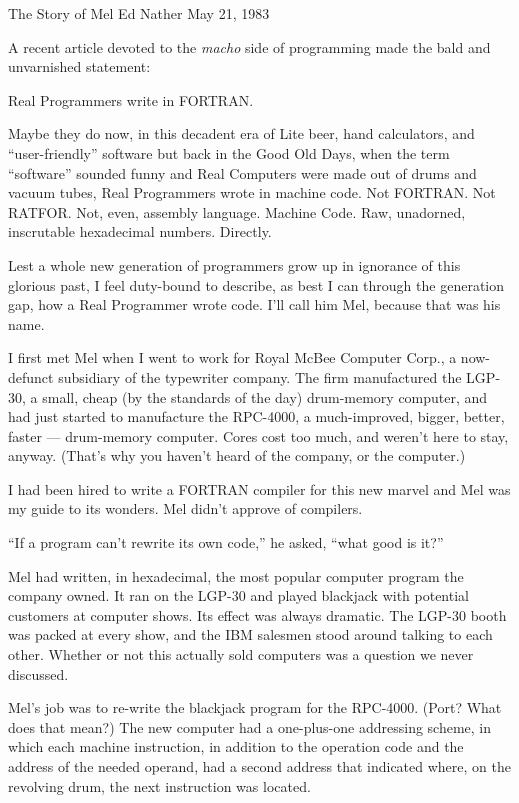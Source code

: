 \documentclass[12pt]{article}
\begin{document}
\noindent
The Story of Mel\newline
Ed Nather\newline
May 21, 1983

\bigskip
\noindent
A recent article devoted to the {\it macho} side of programming
made the bald and unvarnished statement:

\bigskip
\noindent
Real Programmers write in FORTRAN.

\bigskip
\noindent
Maybe they do now,
in this decadent era of
Lite beer, hand calculators, and ``user-friendly'' software
but back in the Good Old Days,
when the term ``software'' sounded funny
and Real Computers were made out of drums and vacuum tubes,
Real Programmers wrote in machine code.
Not FORTRAN.  Not RATFOR.  Not, even, assembly language.
Machine Code.
Raw, unadorned, inscrutable hexadecimal numbers.
Directly.

\bigskip
\noindent
Lest a whole new generation of programmers
grow up in ignorance of this glorious past,
I feel duty-bound to describe,
as best I can through the generation gap,
how a Real Programmer wrote code.
I'll call him Mel,
because that was his name.

\bigskip
\noindent
I first met Mel when I went to work for Royal McBee Computer Corp.,
a now-defunct subsidiary of the typewriter company.
The firm manufactured the LGP-30,
a small, cheap (by the standards of the day)
drum-memory computer,
and had just started to manufacture
the RPC-4000, a much-improved,
bigger, better, faster --- drum-memory computer.
Cores cost too much,
and weren't here to stay, anyway.
(That's why you haven't heard of the company,
or the computer.)

\bigskip
\noindent
I had been hired to write a FORTRAN compiler
for this new marvel and Mel was my guide to its wonders.
Mel didn't approve of compilers.

\bigskip
\noindent
``If a program can't rewrite its own code,''
he asked, ``what good is it?''

\bigskip
\noindent
Mel had written,
in hexadecimal,
the most popular computer program the company owned.
It ran on the LGP-30
and played blackjack with potential customers
at computer shows.
Its effect was always dramatic.
The LGP-30 booth was packed at every show,
and the IBM salesmen stood around
talking to each other.
Whether or not this actually sold computers
was a question we never discussed.

\bigskip
\noindent
Mel's job was to re-write
the blackjack program for the RPC-4000.
(Port?  What does that mean?)
The new computer had a one-plus-one
addressing scheme,
in which each machine instruction,
in addition to the operation code
and the address of the needed operand,
had a second address that indicated where, on the revolving drum,
the next instruction was located.
\end{document}
